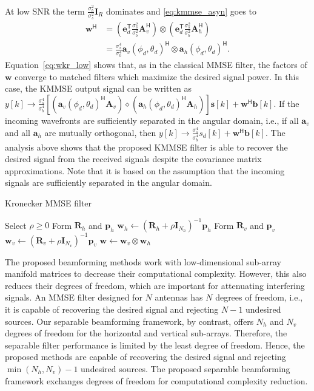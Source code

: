 \documentclass{cta-author}
\newcommand{\tran}{\mathsf{T}}						%
\newcommand{\hermit}{\mathsf{H}}					%
\newcommand{\edes}{\bm{e}_{d}}
\begin{document}
At low SNR the term $\frac{\sigma_b^2}{\sigma_s^2} \bm{I}_R $ dominates and \eqref{eq:kmmse_asyn} goes to
\begin{align}
	\bm{w}^\hermit &= \left( \edes^\tran \frac{\sigma_s^2}{\sigma_b^2}  \bm{A}_v^\hermit\right) \otimes \left( \edes^\tran \frac{\sigma_s^2}{\sigma_b^2}  \bm{A}_h^\hermit\right)\\
						 &= \frac{\sigma_s^4}{\sigma_b^4} \bm{a}_v(\phi_d,\theta_d)^\hermit \otimes \bm{a}_h(\phi_d,\theta_d)^\hermit. \label{eq:wkr_low}
\end{align}
Equation~\eqref{eq:wkr_low} shows that, as in the classical MMSE filter, the factors of $\bm{w}$ converge to matched filters which maximize the desired signal power. In this case, the KMMSE output signal can be written as ${y[k] \rightarrow \frac{\sigma_s^4}{\sigma_b^4} [ ( \bm{a}_v(\phi_d,\theta_d)^\hermit \bm{A}_v ) \diamond ( \bm{a}_h(\phi_d,\theta_d)^\hermit\bm{A}_h ) ] \bm{s}[k] + \bm{w}^\hermit\bm{b}[k]}$. If the incoming wavefronts are sufficiently separated in the angular domain, i.e., if all $\bm{a}_v$ and all $\bm{a}_h$ are mutually orthogonal, then ${y[k] \rightarrow \frac{\sigma_s^4}{\sigma_b^4} s_d[k] + \bm{w}^\hermit\bm{b}[k]}$. The analysis above shows that the proposed KMMSE filter is able to recover the desired signal from the received signals despite the covariance matrix approximations. Note that it is based on the assumption that the incoming signals are sufficiently separated in the angular domain. 

\begin{algorithm}[t]
	\caption{Kronecker MMSE filter}
	\label{alg:kmmse}
	\begin{algorithmic}[1]
		\State Select $\rho \geq 0$ 
		\State Form $\bm{R}_h$ and $\bm{p}_h$
		\State $\bm{w}_h \gets (\bm{R}_h + \rho \bm{I}_{N_h})^{-1} \bm{p}_h$
		\State Form $\bm{R}_v$ and $\bm{p}_v$
		\State $\bm{w}_v \gets (\bm{R}_v + \rho \bm{I}_{N_v})^{-1} \bm{p}_v$
		\State $\bm{w} \gets \bm{w}_v \otimes \bm{w}_h$
	\end{algorithmic}
\end{algorithm}

The proposed beamforming methods work with low-dimensional sub-array manifold matrices to decrease their computational complexity. However, this also reduces their degrees of freedom, which are important for attenuating interfering signals. An MMSE filter designed for $N$ antennas has $N$ degrees of freedom, i.e., it is capable of recovering the desired signal and rejecting $N-1$ undesired sources. Our separable beamforming framework, by contrast, offers $N_h$ and $N_v$ degrees of freedom for the horizontal and vertical sub-arrays. Therefore, the separable filter performance is limited by the least degree of freedom. Hence, the proposed methods are capable of recovering the desired signal and rejecting $\min(N_h, N_v)-1$ undesired sources. The proposed separable beamforming framework exchanges degrees of freedom for computational complexity reduction.
\end{document}
